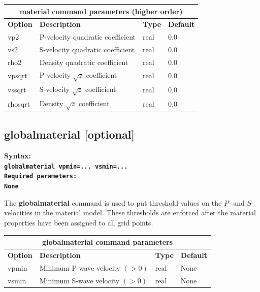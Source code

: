 \documentclass[11pt]{report}
\begin{document}
\begin{center}
\begin{tabular}{|l|p{8cm}|l|l|} \hline
\multicolumn{4}{|c|}{\bf material command parameters (higher order)}\\ \hline
\bf{Option} & \bf{Description} & \bf{Type} & \bf{Default} \\ \hline \hline
vp2 & P-velocity quadratic coefficient & real & 0.0 \\ \hline
vs2 & S-velocity quadratic coefficient & real & 0.0 \\ \hline
rho2 & Density quadratic coefficient   & real & 0.0 \\ \hline
vpsqrt & P-velocity $\sqrt{z}$ coefficient & real & 0.0 \\ \hline
vssqrt & S-velocity $\sqrt{z}$ coefficient & real & 0.0 \\ \hline
rhosqrt & Density $\sqrt{z}$ coefficient    & real & 0.0 \\ \hline
\end{tabular}
\end{center}

\subsection{globalmaterial [optional]}
\label{keyword:globalmaterial}
\begin{flushleft}\bf
Syntax:\\
\tt globalmaterial vpmin=... vsmin=...\\
\bf Required parameters:\\
\rm None
\end{flushleft}
The {\bf globalmaterial} command is used to put threshold values on the $P$- and $S$-velocities in
the material model. These thresholds are enforced after the material properties have been assigned
to all grid points.
\begin{center}
\begin{tabular}{|l|p{8cm}|l|l|} \hline
\multicolumn{4}{|c|}{\bf globalmaterial command parameters}\\ \hline
\bf{Option} & \bf{Description} & \bf{Type} & \bf{Default} \\ \hline \hline
vpmin & Minimum P-wave velocity $(>0)$ & real & None \\ \hline
vsmin & Minimum S-wave velocity $(>0)$ & real & None \\ \hline
\end{tabular}
\end{center}
\end{document}
